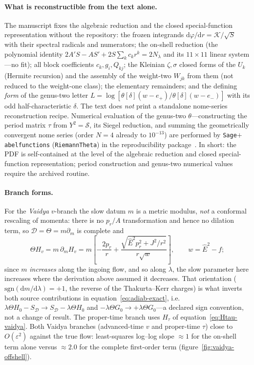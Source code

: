 \documentclass[12pt]{iopart}
\newcommand{\Ehat}{\hat E}
\newcommand{\dd}{\mathrm{d}}
\theoremstyle{plain}
\theoremstyle{definition}
\theoremstyle{plain}
\theoremstyle{remark}
\begin{document}
\paragraph{What is reconstructible from the text alone.} The manuscript fixes the
algebraic reduction and the closed special-function representation without the
repository: the frozen integrands
$\dd\varphi/\dd r=\mathcal K/\sqrt S$ with their spectral radicals and numerators;
the on-shell reduction (the polynomial identity $2A'S-AS'+2S\sum_k c_kr^k=2N_\lambda$
and its $11\times11$ linear system---no fit); all block coefficients $c_k,g_i,Q_{kj}$;
the Kleinian $\zeta,\sigma$ closed forms of the $U_k$ (Hermite recursion) and the assembly
of the weight-two $W_{jk}$ from them (not reduced to the weight-one class); the elementary
remainders; and the defining \emph{form} of the genus-two letter
$L=\log[\theta[\delta](w-e_+)/\theta[\delta](w-e_-)]$ with its odd half-characteristic
$\delta$. The text does \emph{not} print a standalone nome-series reconstruction recipe.
Numerical evaluation of the genus-two $\theta$---constructing the period matrix
$\tau$ from $Y^2=\mathcal S$, its Siegel reduction, and summing the geometrically
convergent nome series (order $N{=}4$ already to $10^{-13}$) are performed by
\texttt{Sage}$+$\texttt{abelfunctions} (\texttt{RiemannTheta}) in the reproducibility
package~\cite{Rosignoli2026CodeJMP}. In short: the PDF is self-contained at the level of the
algebraic reduction and closed special-function representation; period construction and
genus-two numerical values require the archived routine.

\paragraph{Branch forms.} For the \emph{Vaidya} $v$-branch the slow datum $m$ is a metric
modulus, \emph{not} a conformal rescaling of momenta: there is no $p_r/A$ transformation
and hence no dilation term, so $\mathcal D=\Theta=m\partial_m$ is complete and
\begin{equation}
    \Theta H_v=m\,\partial_m H_v
    =m\!\left[-\frac{2p_r}{r}+\frac{\sqrt{\Ehat^2p_r^2+J^2/r^2}}{r\sqrt w}\right],
    \qquad w=\Ehat^2-f;
    \label{eq:ThetaHv}
\end{equation}
since $m$ \emph{increases} along the ingoing flow, and so along $\lambda$, the slow
parameter here increases where the derivation above assumed it decreases. That orientation
($\mathrm{sgn}(\dd m/\dd\lambda)=+1$, the reverse of the Thakurta--Kerr charges) is what
inverts both source contributions in equation~\eqref{eq:adiab-exact}, i.e.\
$\lambda\Theta H_0-S_{\mathcal D}\to S_{\mathcal D}-\lambda\Theta H_0$ and
$-\lambda\Theta G_0\to+\lambda\Theta G_0$---a declared sign convention, not a change of
result. The proper-time branch uses $H_\tau$ of equation~\eqref{eq:Htau-vaidya}. Both Vaidya branches (advanced-time $v$ and proper-time
$\tau$) close to $O(\varepsilon^2)$ against the true flow: least-squares log--log slope
$\approx1$ for the on-shell term alone versus $\approx2.0$ for the complete first-order
term (figure~\ref{fig:vaidya-offshell}).
\end{document}
